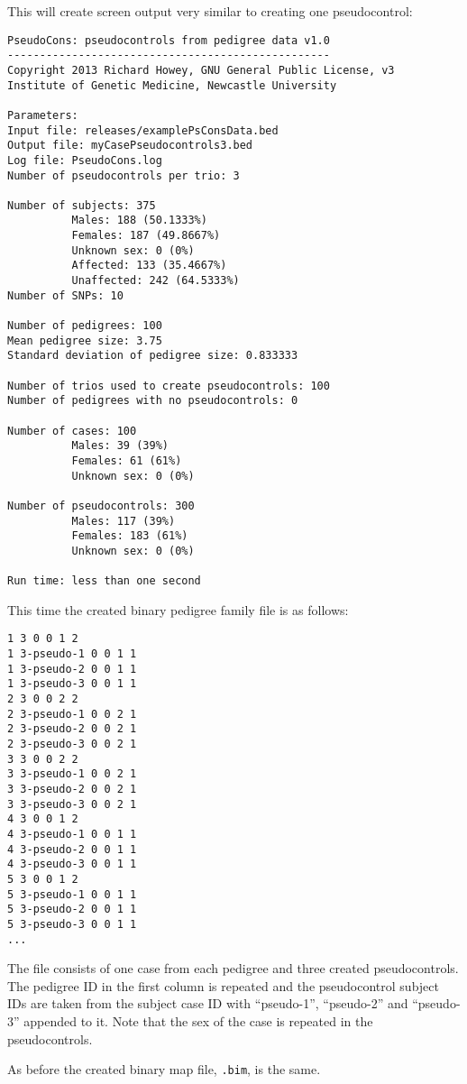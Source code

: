 \documentclass[a4paper,12pt]{article}
\newcommand{\code}[1]{{\footnotesize{{\tt #1}}}}
\begin{document}
This will create screen output very similar to creating one pseudocontrol: 
\begin{verbatim}
PseudoCons: pseudocontrols from pedigree data v1.0
--------------------------------------------------
Copyright 2013 Richard Howey, GNU General Public License, v3
Institute of Genetic Medicine, Newcastle University

Parameters:
Input file: releases/examplePsConsData.bed
Output file: myCasePseudocontrols3.bed
Log file: PseudoCons.log
Number of pseudocontrols per trio: 3

Number of subjects: 375
          Males: 188 (50.1333%)
          Females: 187 (49.8667%)
          Unknown sex: 0 (0%)
          Affected: 133 (35.4667%)
          Unaffected: 242 (64.5333%)
Number of SNPs: 10

Number of pedigrees: 100
Mean pedigree size: 3.75
Standard deviation of pedigree size: 0.833333

Number of trios used to create pseudocontrols: 100
Number of pedigrees with no pseudocontrols: 0

Number of cases: 100
          Males: 39 (39%)
          Females: 61 (61%)
          Unknown sex: 0 (0%)

Number of pseudocontrols: 300
          Males: 117 (39%)
          Females: 183 (61%)
          Unknown sex: 0 (0%)

Run time: less than one second
\end{verbatim}

This time the created binary pedigree family file is as follows: 
\begin{verbatim}
1 3 0 0 1 2
1 3-pseudo-1 0 0 1 1
1 3-pseudo-2 0 0 1 1
1 3-pseudo-3 0 0 1 1
2 3 0 0 2 2
2 3-pseudo-1 0 0 2 1
2 3-pseudo-2 0 0 2 1
2 3-pseudo-3 0 0 2 1
3 3 0 0 2 2
3 3-pseudo-1 0 0 2 1
3 3-pseudo-2 0 0 2 1
3 3-pseudo-3 0 0 2 1
4 3 0 0 1 2
4 3-pseudo-1 0 0 1 1
4 3-pseudo-2 0 0 1 1
4 3-pseudo-3 0 0 1 1
5 3 0 0 1 2
5 3-pseudo-1 0 0 1 1
5 3-pseudo-2 0 0 1 1
5 3-pseudo-3 0 0 1 1
...
\end{verbatim}

The file consists of one case from each pedigree and three created pseudocontrols. The pedigree ID in the first column is repeated and the pseudocontrol subject IDs are taken from the subject case ID with ``pseudo-1'', ``pseudo-2'' and ``pseudo-3'' appended to it. Note that the sex of the case is repeated in the pseudocontrols. 

As before the created binary map file, \code{.bim}, is the same. 
\end{document}
